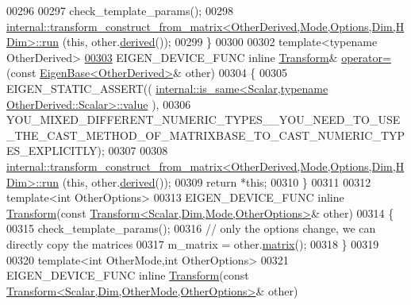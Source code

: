 \begin{DoxyCode}
00296 
00297     check\_template\_params();
00298     
      \hyperlink{struct_eigen_1_1internal_1_1transform__construct__from__matrix}{internal::transform\_construct\_from\_matrix<OtherDerived,Mode,Options,Dim,HDim>::run}
      (\textcolor{keyword}{this}, other.\hyperlink{group___core___module_a324b16961a11d2ecfd2d1b7dd7946545}{derived}());
00299   \}
00300 
00302   \textcolor{keyword}{template}<\textcolor{keyword}{typename} OtherDerived>
\hyperlink{group___geometry___module_ada0d6d0b497e2db223e23fcaa4e8961d}{00303}   EIGEN\_DEVICE\_FUNC \textcolor{keyword}{inline} \hyperlink{group___geometry___module_class_eigen_1_1_transform}{Transform}& \hyperlink{group___geometry___module_ada0d6d0b497e2db223e23fcaa4e8961d}{operator=}(\textcolor{keyword}{const} 
      \hyperlink{group___core___module_struct_eigen_1_1_eigen_base}{EigenBase<OtherDerived>}& other)
00304   \{
00305     EIGEN\_STATIC\_ASSERT((
      \hyperlink{struct_eigen_1_1internal_1_1is__same}{internal::is\_same<Scalar,typename OtherDerived::Scalar>::value}
      ),
00306       
      YOU\_MIXED\_DIFFERENT\_NUMERIC\_TYPES\_\_YOU\_NEED\_TO\_USE\_THE\_CAST\_METHOD\_OF\_MATRIXBASE\_TO\_CAST\_NUMERIC\_TYPES\_EXPLICITLY);
00307 
00308     
      \hyperlink{struct_eigen_1_1internal_1_1transform__construct__from__matrix}{internal::transform\_construct\_from\_matrix<OtherDerived,Mode,Options,Dim,HDim>::run}
      (\textcolor{keyword}{this}, other.\hyperlink{group___core___module_a324b16961a11d2ecfd2d1b7dd7946545}{derived}());
00309     \textcolor{keywordflow}{return} *\textcolor{keyword}{this};
00310   \}
00311   
00312   \textcolor{keyword}{template}<\textcolor{keywordtype}{int} OtherOptions>
00313   EIGEN\_DEVICE\_FUNC \textcolor{keyword}{inline} \hyperlink{group___geometry___module_class_eigen_1_1_transform}{Transform}(\textcolor{keyword}{const} 
      \hyperlink{group___geometry___module_class_eigen_1_1_transform}{Transform<Scalar,Dim,Mode,OtherOptions>}& other)
00314   \{
00315     check\_template\_params();
00316     \textcolor{comment}{// only the options change, we can directly copy the matrices}
00317     m\_matrix = other.\hyperlink{group___geometry___module_aec8168000a88a807130d41020af98d47}{matrix}();
00318   \}
00319 
00320   \textcolor{keyword}{template}<\textcolor{keywordtype}{int} OtherMode,\textcolor{keywordtype}{int} OtherOptions>
00321   EIGEN\_DEVICE\_FUNC \textcolor{keyword}{inline} \hyperlink{group___geometry___module_class_eigen_1_1_transform}{Transform}(\textcolor{keyword}{const} 
      \hyperlink{group___geometry___module_class_eigen_1_1_transform}{Transform<Scalar,Dim,OtherMode,OtherOptions>}& other)

\end{DoxyCode}
